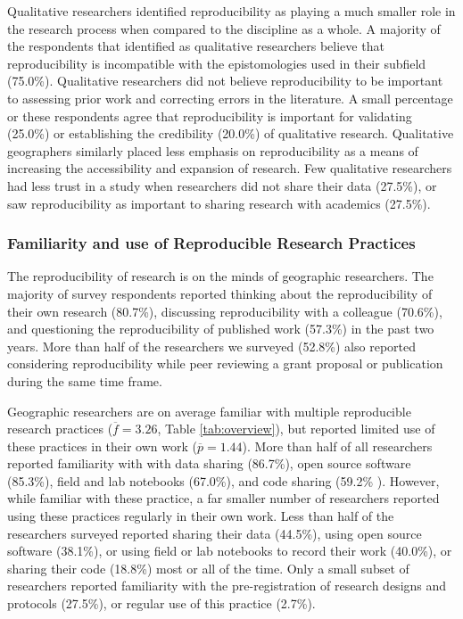 \documentclass[]{interact}
\theoremstyle{plain}%
\theoremstyle{definition}
\theoremstyle{remark}
\begin{document}
Qualitative researchers identified reproducibility as playing a much smaller role in the research process when compared to the discipline as a whole. 
A majority of the respondents that identified as qualitative researchers believe that reproducibility is incompatible with the epistomologies used in their subfield (75.0\%).
Qualitative researchers did not believe reproducibility to be important to assessing prior work and correcting errors in the literature. 
A small percentage or these respondents agree that reproducibility is important for validating (25.0\%) or establishing the credibility (20.0\%) of qualitative research.
Qualitative geographers similarly placed less emphasis on reproducibility as a means of increasing the accessibility and expansion of research.
Few qualitative researchers had less trust in a study when researchers did not share their data (27.5\%), or saw reproducibility as important to sharing research with academics (27.5\%).



\subsubsection*{Familiarity and use of Reproducible Research Practices}
The reproducibility of research is on the minds of geographic researchers. 
The majority of survey respondents reported thinking about the reproducibility of their own research (80.7\%), discussing reproducibility with a colleague (70.6\%), and questioning the reproducibility of published work (57.3\%) in the past two years. 
More than half of the researchers we surveyed (52.8\%) also reported considering reproducibility while peer reviewing a grant proposal or publication during the same time frame. 

Geographic researchers are on average familiar with multiple reproducible research practices ($\overline{f}=3.26$, Table \ref{tab:overview}), but reported limited use of these practices in their own work ($\overline{p}=1.44$).
More than half of all researchers reported familiarity with with data sharing (86.7\%), open source software (85.3\%), field and lab notebooks (67.0\%), and code sharing (59.2\% ).
However, while familiar with these practice, a far smaller number of researchers reported using these practices regularly in their own work. 
Less than half of the researchers surveyed reported sharing their data (44.5\%), using open source software (38.1\%), or using field or lab notebooks to record their work (40.0\%), or sharing their code (18.8\%) most or all of the time. 
Only a small subset of researchers reported familiarity with the pre-registration of research designs and protocols (27.5\%), or regular use of this practice (2.7\%).
\end{document}
